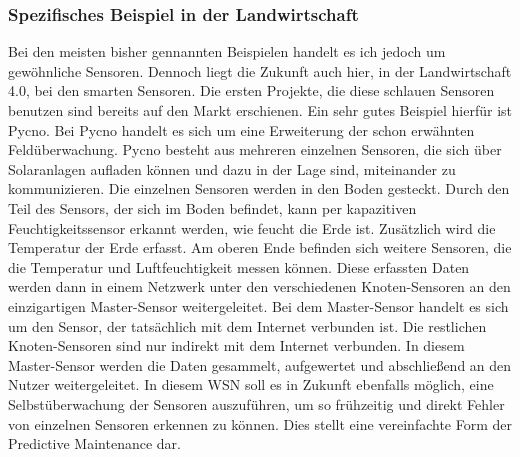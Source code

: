 \documentclass[a4paper,12pt]{scrartcl}
\begin{document}
\cite{Cowlar.}

\subsubsection{Spezifisches Beispiel in der Landwirtschaft}
Bei den meisten bisher gennannten Beispielen handelt es ich jedoch um gewöhnliche Sensoren. Dennoch liegt die Zukunft auch hier, in der Landwirtschaft 4.0, bei den smarten Sensoren.
Die ersten Projekte, die diese schlauen Sensoren benutzen sind bereits auf den Markt erschienen. Ein sehr gutes Beispiel hierfür ist Pycno. Bei Pycno handelt es sich um eine Erweiterung der schon erwähnten Feldüberwachung. 
Pycno besteht aus mehreren einzelnen Sensoren, die sich über Solaranlagen aufladen können und dazu in der Lage sind, miteinander zu kommunizieren. Die einzelnen Sensoren werden in den Boden gesteckt. Durch den Teil des Sensors, der sich im Boden befindet, kann per kapazitiven Feuchtigkeitssensor erkannt werden, wie feucht die Erde ist. Zusätzlich wird die Temperatur der Erde erfasst. Am oberen Ende befinden sich weitere Sensoren, die die Temperatur und Luftfeuchtigkeit messen können. Diese erfassten Daten werden dann in einem Netzwerk unter den verschiedenen Knoten-Sensoren an den einzigartigen Master-Sensor weitergeleitet. Bei dem Master-Sensor handelt es sich um den Sensor, der tatsächlich mit dem Internet verbunden ist. Die restlichen Knoten-Sensoren sind nur indirekt mit dem Internet verbunden. In diesem Master-Sensor werden die Daten gesammelt, aufgewertet und abschließend an den Nutzer weitergeleitet.
In diesem WSN soll es in Zukunft ebenfalls möglich, eine Selbstüberwachung der Sensoren auszuführen, um so frühzeitig und direkt Fehler von einzelnen Sensoren erkennen zu können. Dies stellt eine vereinfachte Form der Predictive Maintenance dar.

\cite{Pycno.}
\end{document}
